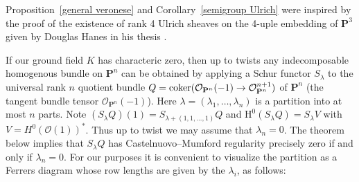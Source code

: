\documentclass{jams-l}
\theoremstyle{definition}
\theoremstyle{remark}
\newcommand{\Hrm}{{\mathrm H}}
\newcommand{\Ocal}{{\mathcal O}}
\newcommand{\cO}{{\mathcal O}}
\newcommand{\PP}{{\mathbf P}}
\newcommand{\coker}{\mathop{\rm coker}}
\begin{document}
Proposition~\ref{general veronese} and Corollary~\ref{semigroup Ulrich} were 
inspired by the proof of the existence of rank
4 Ulrich sheaves on the 4-uple embedding of $\PP^3$ given
by Douglas Hanes in his thesis 
\cite{Hanes 2000}.

If our ground field $K$ has characteric zero, then 
up to twists
any indecomposable homogenous bundle
on $\PP^n$ can be obtained by applying a Schur functor $S_\lambda$ to
the universal rank $n$ quotient bundle $Q=\coker(\Ocal_{\PP^n}(-1) \to \Ocal_{\PP^n}^{n+1})$ 
of $\PP^n$ (the tangent bundle tensor $\Ocal_{\PP^n}(-1)$).
Here $\lambda=(\lambda_1,\ldots,\lambda_n)$ is a partition into at most
$n$ parts. Note $(S_\lambda Q)(1)=S_{\lambda+(1,1,\ldots,1)} Q$ 
and $\Hrm^0(S_\lambda Q) = S_\lambda V$ with
$V = H^0(\cO(1))^*$.
Thus up to twist we may assume that $\lambda_n=0$. The theorem below implies that
$S_\lambda Q$ has Castelnuovo--Mumford regularity precisely zero if and only if $\lambda_n=0$.
For our purposes it is convenient to visualize the partition as a Ferrers diagram
whose row lengths are given by the $\lambda_i$, as follows:
\end{document}
